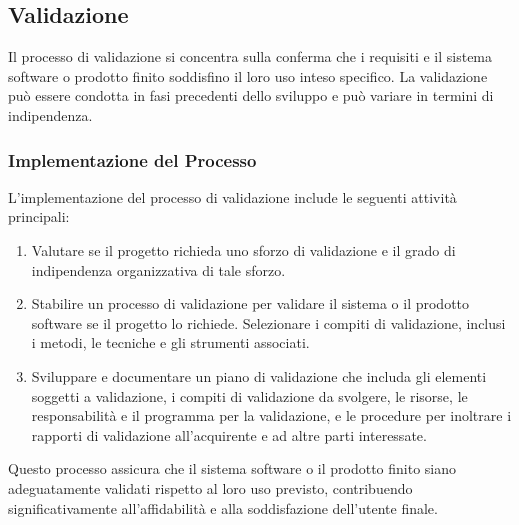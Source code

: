 \subsection{Validazione}

Il processo di validazione si concentra sulla conferma che i requisiti e il
sistema software o prodotto finito soddisfino il loro uso inteso specifico. La
validazione può essere condotta in fasi precedenti dello sviluppo e può
variare in termini di indipendenza.

\subsubsection{Implementazione del Processo}
L'implementazione del processo di validazione include le seguenti attività
principali:

\begin{enumerate}
	\item Valutare se il progetto richieda uno sforzo di validazione e il
	      grado di indipendenza organizzativa di tale sforzo.
	\item Stabilire un processo di validazione per validare il sistema o il
	      prodotto software se il progetto lo richiede. Selezionare i compiti di
	      validazione, inclusi i metodi, le tecniche e gli strumenti associati.
	\item Sviluppare e documentare un piano di validazione che includa gli
	      elementi soggetti a validazione, i compiti di validazione da svolgere,
	      le risorse, le responsabilità e il programma per la validazione, e le
	      procedure per inoltrare i rapporti di validazione all'acquirente e ad
	      altre parti interessate.
\end{enumerate}

Questo processo assicura che il sistema software o il prodotto finito siano
adeguatamente validati rispetto al loro uso previsto, contribuendo
significativamente all'affidabilità e alla soddisfazione dell'utente finale.
